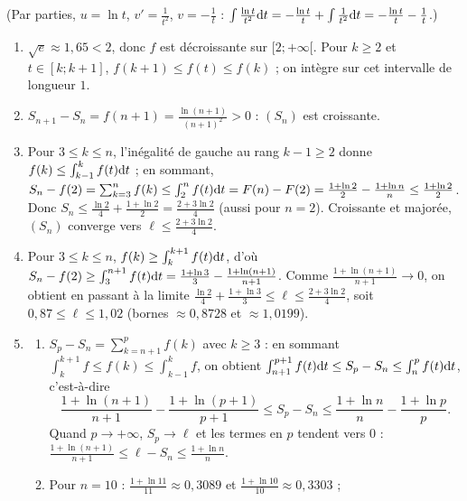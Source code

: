\begin{corrige}
\begin{sol}
\begin{description}
\begin{enumerate}
            (Par parties, $u = \ln t$, $v' = \frac{1}{t^2}$, $v = -\frac{1}{t}$ :
            $\int \frac{\ln t}{t^2}\mathrm{d}t = -\frac{\ln t}{t} + \int \frac{1}{t^2}\mathrm{d}t = -\frac{\ln t}{t} - \frac{1}{t}$.)
      \end{enumerate}
\item[Partie B.] \begin{enumerate}
      \item $\sqrt{e} \approx 1{,}65 < 2$, donc $f$ est d\'ecroissante sur $[2 ; +\infty[$. Pour $k \geq 2$ et $t \in [k ; k+1]$,
            $f(k + 1) \leq f(t) \leq f(k)$ ; on int\`egre sur cet intervalle de longueur $1$.
      \item $S_{n+1} - S_n = f(n + 1) = \frac{\ln(n+1)}{(n+1)^2} > 0$ : $(S_n)$ est croissante.
      \item Pour $3 \leq k \leq n$, l'in\'egalit\'e de gauche au rang $k - 1 \geq 2$ donne $f(k) \leq \int_{k-1}^{k} f(t)\mathrm{d}t$ ; en sommant,
            $S_n - f(2) = \sum_{k=3}^n f(k) \leq \int_2^n f(t)\mathrm{d}t = F(n) - F(2) = \frac{1 + \ln 2}{2} - \frac{1 + \ln n}{n} \leq \frac{1 + \ln 2}{2}$.
            Donc $S_n \leq \frac{\ln 2}{4} + \frac{1 + \ln 2}{2} = \frac{2 + 3\ln 2}{4}$ (aussi pour $n = 2$).
            Croissante et major\'ee, $(S_n)$ converge vers $\ell \leq \frac{2 + 3\ln 2}{4}$.
      \item Pour $3 \leq k \leq n$, $f(k) \geq \int_k^{k+1} f(t)\mathrm{d}t$, d'o\`u
            $S_n - f(2) \geq \int_3^{n+1} f(t)\mathrm{d}t = \frac{1 + \ln 3}{3} - \frac{1 + \ln(n+1)}{n+1}$.
            Comme $\frac{1 + \ln(n+1)}{n+1} \to 0$, on obtient en passant \`a la limite
            $\boxed{\frac{\ln 2}{4} + \frac{1 + \ln 3}{3} \leq \ell \leq \frac{2 + 3\ln 2}{4}}$, soit $0{,}87 \leq \ell \leq 1{,}02$
            (bornes $\approx 0{,}8728$ et $\approx 1{,}0199$).
      \item \begin{enumerate}
            \item $S_p - S_n = \sum_{k=n+1}^{p} f(k)$ avec $k \geq 3$ : en sommant $\int_k^{k+1} f \leq f(k) \leq \int_{k-1}^k f$, on obtient
                  $\int_{n+1}^{p+1} f(t)\mathrm{d}t \leq S_p - S_n \leq \int_n^p f(t)\mathrm{d}t$, c'est-\`a-dire
                  \[
                  \frac{1 + \ln(n+1)}{n+1} - \frac{1 + \ln(p+1)}{p+1} \leq S_p - S_n \leq \frac{1 + \ln n}{n} - \frac{1 + \ln p}{p} .
                  \]
                  Quand $p \to +\infty$, $S_p \to \ell$ et les termes en $p$ tendent vers $0$ :
                  $\frac{1 + \ln(n+1)}{n+1} \leq \ell - S_n \leq \frac{1 + \ln n}{n}$.
            \item Pour $n = 10$ : $\frac{1 + \ln 11}{11} \approx 0{,}3089$ et $\frac{1 + \ln 10}{10} \approx 0{,}3303$ ;

\end{enumerate}
\end{enumerate}
\end{description}
\end{sol}
\end{corrige}
